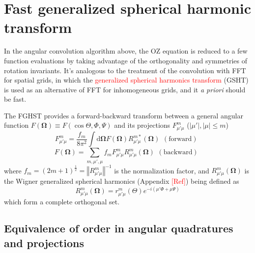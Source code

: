 \section{Fast generalized spherical harmonic transform}

In the angular convolution algorithm above, the OZ equation is reduced
to a few function evaluations by taking advantage of the orthogonality
and symmetries of rotation invariants. It's analogous to the treatment
of the convolution with FFT for spatial grids, in which the \textcolor{red}{generalized
spherical harmonics transform} (GSHT) is used as an alternative of
FFT for inhomogeneous grids, and it \textit{a priori }should be fast.

The FGHST provides a forward-backward transform between a general
angular function $F(\mathbf{\Omega})\equiv F(\cos\Theta,\Phi,\Psi)$
and its projections $F_{\mu'\mu}^{m}$ ($\left|\mu'\right|,\left|\mu\right|\leq m$)
\begin{equation}
F_{\mu'\mu}^{m}=\frac{f_{m}}{8\pi^{2}}\int\mathrm{d}\mathbf{\Omega}F(\mathbf{\Omega})R_{\mu'\mu}^{m*}(\mathbf{\Omega})\begin{array}{c}
\mathrm{(forward)}\end{array}\label{eq:GSHT_forward}
\end{equation}
\begin{equation}
F(\mathbf{\Omega})=\sum_{m,\mu',\mu}f_{m}F_{\mu'\mu}^{m}R_{\mu'\mu}^{m}(\mathbf{\Omega})\begin{array}{c}
\mathrm{(backward)}\end{array}\label{eq:GSHT_backward}
\end{equation}
where $f_{m}=\left(2m+1\right)^{\frac{1}{2}}=\left\Vert R_{\mu'\mu}^{m}\right\Vert ^{-1}$
is the normalization factor, and $R_{\mu'\mu}^{m}(\mathbf{\Omega})$
is the Wigner generalized spherical harmonics (Appendix \textcolor{red}{{[}Ref{]}})
being defined as
\begin{equation}
R_{\mu'\mu}^{m}(\mathbf{\Omega})=r_{\mu'\mu}^{m}(\Theta)e^{-i(\mu'\Phi+\mu\Psi)}
\end{equation}
which form a complete orthogonal set.


\subsection{Equivalence of order in angular quadratures and projections}

